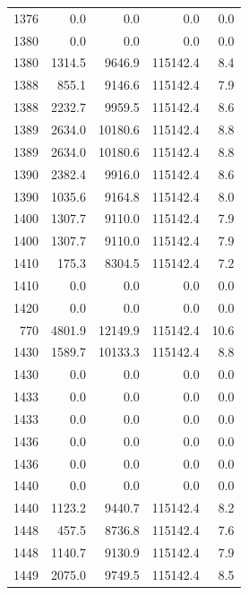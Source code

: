 \begin{longtable}{rrrrr}
    1376 & \num{0.0} & \num{0.0} & \num{0.0} & 0.0 \\
    1380 & \num{0.0} & \num{0.0} & \num{0.0} & 0.0 \\
    1380 & \num{1314.5} & \num{9646.9} & \num{115142.4} & 8.4 \\
    1388 & \num{855.1} & \num{9146.6} & \num{115142.4} & 7.9 \\
    1388 & \num{2232.7} & \num{9959.5} & \num{115142.4} & 8.6 \\
    1389 & \num{2634.0} & \num{10180.6} & \num{115142.4} & 8.8 \\
    1389 & \num{2634.0} & \num{10180.6} & \num{115142.4} & 8.8 \\
    1390 & \num{2382.4} & \num{9916.0} & \num{115142.4} & 8.6 \\
    1390 & \num{1035.6} & \num{9164.8} & \num{115142.4} & 8.0 \\
    1400 & \num{1307.7} & \num{9110.0} & \num{115142.4} & 7.9 \\
    1400 & \num{1307.7} & \num{9110.0} & \num{115142.4} & 7.9 \\
    1410 & \num{175.3} & \num{8304.5} & \num{115142.4} & 7.2 \\
    1410 & \num{0.0} & \num{0.0} & \num{0.0} & 0.0 \\
    1420 & \num{0.0} & \num{0.0} & \num{0.0} & 0.0 \\
    770 & \num{4801.9} & \num{12149.9} & \num{115142.4} & 10.6 \\
    1430 & \num{1589.7} & \num{10133.3} & \num{115142.4} & 8.8 \\
    1430 & \num{0.0} & \num{0.0} & \num{0.0} & 0.0 \\
    1433 & \num{0.0} & \num{0.0} & \num{0.0} & 0.0 \\
    1433 & \num{0.0} & \num{0.0} & \num{0.0} & 0.0 \\
    1436 & \num{0.0} & \num{0.0} & \num{0.0} & 0.0 \\
    1436 & \num{0.0} & \num{0.0} & \num{0.0} & 0.0 \\
    1440 & \num{0.0} & \num{0.0} & \num{0.0} & 0.0 \\
    1440 & \num{1123.2} & \num{9440.7} & \num{115142.4} & 8.2 \\
    1448 & \num{457.5} & \num{8736.8} & \num{115142.4} & 7.6 \\
    1448 & \num{1140.7} & \num{9130.9} & \num{115142.4} & 7.9 \\
    1449 & \num{2075.0} & \num{9749.5} & \num{115142.4} & 8.5 \\

\end{longtable}
